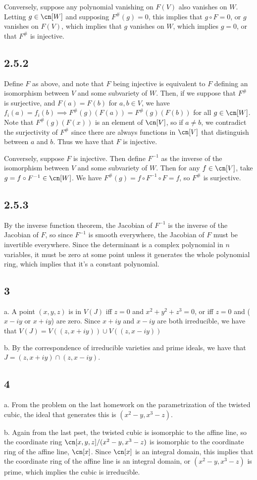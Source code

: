 \documentclass{article}
\begin{document}
Conversely, suppose any polynomial vanishing on $F(V)$ also vanishes on $W$. Letting $g\in\cn[W]$ and supposing $F^\#(g)=0$, this implies that $g\circ F=0$, or $g$ vanishes on $F(V)$, which implies that $g$ vanishes on $W$, which implies $g=0$, or that $F^\#$ is injective.
\subsection*{2.5.2}
Define $F$ as above, and note that $F$ being injective is equivalent to $F$ defining an isomorphism between $V$ and some subvariety of $W$. Then, if we suppose that $F^\#$ is surjective, and $F(a)=F(b)$ for $a,b\in V$, we have $f_i(a)=f_i(b)\implies F^\#(g)(F(a))=F^\#(g)(F(b))$ for all $g\in\cn[W]$. Note that $F^\#(g)(F(x))$ is an element of $\cn[V]$, so if $a\neq b$, we contradict the surjectivity of $F^\#$ since there are always functions in $\cn[V]$ that distinguish between $a$ and $b$. Thus we have that $F$ is injective.

Conversely, suppose $F$ is injective. Then define $F^{-1}$ as the inverse of the isomorphism between $V$ and some subvariety of $W$. Then for any $f\in\cn[V]$, take $g=f\circ F^{-1}\in\cn[W]$. We have $F^\#(g)=f\circ F^{-1}\circ F=f$, so $F^\#$ is surjective.
\subsection*{2.5.3}
By the inverse function theorem, the Jacobian of $F^{-1}$ is the inverse of the Jacobian of $F$, so since $F^{-1}$ is smooth everywhere, the Jacobian of $F$ must be invertible everywhere. Since the determinant is a complex polynomial in $n$ variables, it must be zero at some point unless it generates the whole polynomial ring, which implies that it's a constant polynomial.
\subsection*{3}
a. A point $(x,y,z)$ is in $V(J)$ iff $z=0$ and $x^2+y^2+z^3=0$, or iff $z=0$ and ($x-iy$ or $x+iy$) are zero. Since $x+iy$ and $x-iy$ are both irreducible, we have that $V(J)=V((z,x+iy))\cup V((z,x-iy))$

b. By the correspondence of irreducible varieties and prime ideals, we have that $J=(z,x+iy)\cap(z,x-iy)$.
\subsection*{4}
a. From the problem on the last homework on the parametrization of the twisted cubic, the ideal that generates this is $(x^2-y,x^3-z)$. 

b. Again from the last pset, the twisted cubic is isomorphic to the affine line, so the coordinate ring $\cn[x,y,z]/(x^2-y,x^3-z)$ is isomorphic to the coordinate ring of the affine line, $\cn[x]$. Since $\cn[x]$ is an integral domain, this implies that the coordinate ring of the affine line is an integral domain, or $(x^2-y,x^3-z)$ is prime, which implies the cubic is irreducible.
\end{document}
